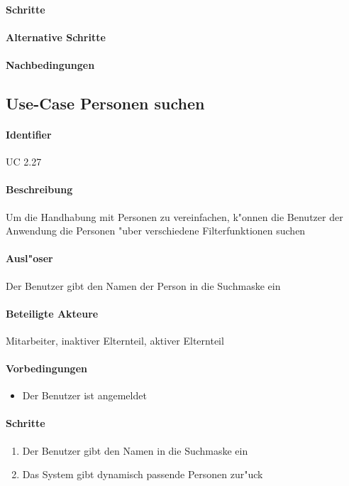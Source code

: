   \paragraph{Schritte}
  \paragraph{Alternative Schritte}
  \paragraph{Nachbedingungen}

  
  \newpage
 \subsection{Use-Case Personen suchen}
  \paragraph{Identifier}
  UC 2.27
  \paragraph{Beschreibung}
  Um die Handhabung mit Personen zu vereinfachen, k"onnen die Benutzer der Anwendung die Personen "uber verschiedene Filterfunktionen suchen
  \paragraph{Ausl"oser}
  Der Benutzer gibt den Namen der Person in die Suchmaske ein
  \paragraph{Beteiligte Akteure}   \leavevmode \newline
    Mitarbeiter, inaktiver Elternteil, aktiver Elternteil
  \paragraph{Vorbedingungen}
  \begin{itemize}
   \item Der Benutzer ist angemeldet
  \end{itemize}

  \paragraph{Schritte}
  \begin{enumerate}
   \item Der Benutzer gibt den Namen in die Suchmaske ein
   \item Das System gibt dynamisch passende Personen zur"uck
  \end{enumerate}

